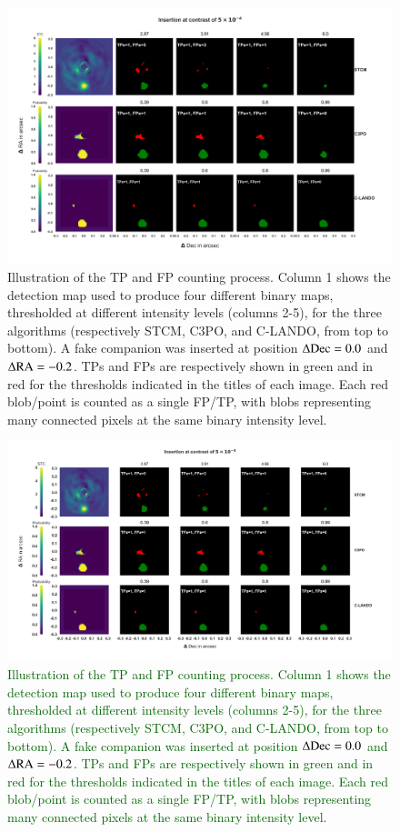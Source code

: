 \documentclass{aa}
\newcommand{\newchange}[1]{\textcolor{darkgreen}{#1}}
\begin{document}
\begin{figure}[t]
    \centering
    \includegraphics[width=\textwidth]{Fig3_Sep2023.png}
    \caption{Illustration of the TP and FP counting process. Column 1 shows the detection map used to produce four different binary maps, thresholded at different intensity levels (columns 2-5), for the three algorithms (respectively STCM, C3PO, and C-LANDO, from top to bottom). A fake companion was inserted at position $\Delta{\rm Dec}=0.0$ and $\Delta{\rm RA} = -0.2$. TPs and FPs are respectively shown in green and in red for the thresholds indicated in the titles of each image. Each red blob/point is counted as a single FP/TP, with blobs representing many connected pixels at the same binary intensity level.}
\end{figure}
\begin{figure}[t]
    \centering
    \includegraphics[width=\textwidth]{Fig3_Mar2024_referee.png}
    \caption{\newchange{Illustration of the TP and FP counting process. Column 1 shows the detection map used to produce four different binary maps, thresholded at different intensity levels (columns 2-5), for the three algorithms (respectively STCM, C3PO, and C-LANDO, from top to bottom). A fake companion was inserted at position $\Delta{\rm Dec}=0.0$ and $\Delta{\rm RA} = -0.2$. TPs and FPs are respectively shown in green and in red for the thresholds indicated in the titles of each image. Each red blob/point is counted as a single FP/TP, with blobs representing many connected pixels at the same binary intensity level.}}
    \label{fig:sample_detmaps}
\end{figure}
\end{document}
